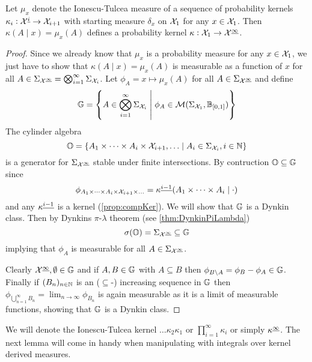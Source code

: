 \begin{prop}
  Let $\mu_x$ denote the Ionescu-Tulcea measure of a
  sequence of probability kernels
  $\kappa_i : \mathcal{X}^{\underline{i}} \to \mathcal{X}_{i+1}$
  with starting measure $\delta_x$ on $\mathcal{X}_1$ for any $x \in \mathcal{X}_1$.
  Then $\kappa(A \mid x) = \mu_x(A)$ defines a probability kernel
  $\kappa : \mathcal{X}_1 \to \mathcal{X}^{\underline{\infty}}$.
\end{prop}
\begin{proof}
  Since we already know that $\mu_x$ is a probability measure for any
  $x \in \mathcal{X}_1$,
  we just have to show that $\kappa(A \mid x) = \mu_x(A)$ is measurable
  as a function of $x$ for all
  $A \in \Sigma_{\mathcal{X}^{\underline{\infty}}}
  = \bigotimes_{i=1}^\infty \Sigma_{\mathcal{X}_i}$.
  Let $\phi_A = x \mapsto \mu_x(A)$
  for all $A \in \Sigma_\mathcal{X^{\underline{\infty}}}$ and define
  \[ \mathbb{G} = \left\{ A \in \bigotimes_{i=1}^\infty \Sigma_{\mathcal{X}_i}
  \;\middle\vert\; \phi_A \in \mathcal{M}(\Sigma_{\mathcal{X}_1}, \mathbb{B}_{[0,1]}) \right\} \]
  The cylinder algebra
  \[ \mathbb{O} = \left\{ A_1 \times \dots \times A_i \times \mathcal{X}_{i+1},
  \dots \;\middle\vert\; A_i \in \Sigma_{\mathcal{X}_i}, i \in \mathbb{N} \right\} \]
  is a generator for $\Sigma_{\mathcal{X}^{\underline{\infty}}}$ stable under 
  finite intersections.
  By contruction $\mathbb{O} \subseteq \mathbb{G}$ since
  \[ \phi_{A_1 \times \dots \times A_i \times \mathcal{X}_{i+1} \times \dots}
  = \kappa^{\underline{i-1}}(A_1 \times \dots \times A_i \mid \cdot) \]
  and any $\kappa^{\underline{i-1}}$ is a kernel (\cref{prop:compKer}).
  We will show that $\mathbb{G}$ is a Dynkin class.
  Then by Dynkins $\pi$-$\lambda$ theorem (see \cref{thm:DynkinPiLambda})
  \[ \sigma(\mathbb{O}) = \Sigma_{\mathcal{X}^{\underline{\infty}}}
  \subseteq \mathbb{G} \]
  implying that $\phi_A$ is measurable
  for all $A \in \Sigma_{\mathcal{X}^{\underline{\infty}}}$.
  
  Clearly $\mathcal{X}^{\underline{\infty}}, \emptyset \in \mathbb{G}$ and if
  $A,B \in \mathbb{G}$ with $A \subseteq B$ then
  $\phi_{B \setminus A} = \phi_B - \phi_A \in \mathbb{G}$.
  Finally if $(B_n)_{n \in \mathbb{N}}$ is an ($\subseteq$-) increasing sequence
  in $\mathbb{G}$ then $\phi_{\bigcup_{n=1}^\infty B_n} =
  \lim_{n \to \infty} \phi_{B_n}$ is again measurable as it is a
  limit of measurable functions, showing that $\mathbb{G}$ is a Dynkin class.
\end{proof}

We will denote the Ionescu-Tulcea kernel $\dots \kappa_2 \kappa_1$ or
$\prod_{i=1}^\infty \kappa_i$ or simply $\kappa^{\underline{\infty}}$.
The next lemma will come in handy when manipulating with integrals over
kernel derived measures.

